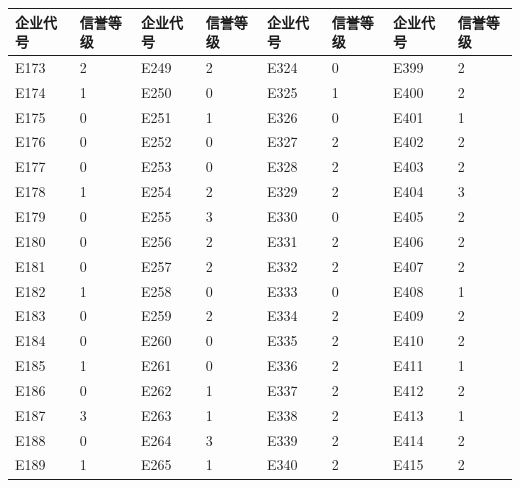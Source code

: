 \documentclass[UTF8]{ctexart}
\begin{document}
\begin{table}[H]
	\centering
	\begin{tabular}{|l|l|l|l|l|l|l|l|}
		\hline
		企业代号 & 信誉等级 & 企业代号 & 信誉等级 & 企业代号 & 信誉等级 & 企业代号 & 信誉等级 \\ \hline
		E173     & 2        & E249     & 2        & E324     & 0        & E399     & 2        \\ \hline
		E174     & 1        & E250     & 0        & E325     & 1        & E400     & 2        \\ \hline
		E175     & 0        & E251     & 1        & E326     & 0        & E401     & 1        \\ \hline
		E176     & 0        & E252     & 0        & E327     & 2        & E402     & 2        \\ \hline
		E177     & 0        & E253     & 0        & E328     & 2        & E403     & 2        \\ \hline
		E178     & 1        & E254     & 2        & E329     & 2        & E404     & 3        \\ \hline
		E179     & 0        & E255     & 3        & E330     & 0        & E405     & 2        \\ \hline
		E180     & 0        & E256     & 2        & E331     & 2        & E406     & 2        \\ \hline
		E181     & 0        & E257     & 2        & E332     & 2        & E407     & 2        \\ \hline
		E182     & 1        & E258     & 0        & E333     & 0        & E408     & 1        \\ \hline
		E183     & 0        & E259     & 2        & E334     & 2        & E409     & 2        \\ \hline
		E184     & 0        & E260     & 0        & E335     & 2        & E410     & 2        \\ \hline
		E185     & 1        & E261     & 0        & E336     & 2        & E411     & 1        \\ \hline
		E186     & 0        & E262     & 1        & E337     & 2        & E412     & 2        \\ \hline
		E187     & 3        & E263     & 1        & E338     & 2        & E413     & 1        \\ \hline
		E188     & 0        & E264     & 3        & E339     & 2        & E414     & 2        \\ \hline
		E189     & 1        & E265     & 1        & E340     & 2        & E415     & 2        \\ \hline

\end{tabular}
\end{table}
\end{document}

